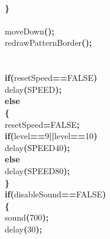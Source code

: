 \documentclass[a4paper, 10pt]{article}
\newcommand\SPC{\hspace*{0.6em}}
\newcommand\HYP{\mbox{\char 45}}
\newcommand{\CppAIdentifier}[1]{#1}
\newcommand{\CppANumber}[1]{\textcolor[rgb]{0.5,0,0.5}{#1}}
\newcommand{\CppAReservedWord}[1]{\textbf{#1}}
\newcommand{\CppASpace}[1]{\colorbox[rgb]{1,1,1}{#1}}
\newcommand{\CppASymbol}[1]{\textbf{\textcolor[rgb]{1,0,0}{#1}}}
\begin{document}
\begin{ttfamily}
\\
\CppASpace{\SPC \SPC \SPC }\CppASymbol{\}}\\
\\
\CppASpace{\SPC \SPC \SPC }\CppAIdentifier{moveDown}\CppASymbol{(}\CppASymbol{)}\CppASymbol{;}\\
\CppASpace{\SPC \SPC \SPC }\CppAIdentifier{redrawPatternBorder}\CppASymbol{(}\CppASymbol{)}\CppASymbol{;}\\
\\
\\
\CppASpace{\SPC \SPC \SPC }\CppAReservedWord{if}\CppASymbol{(}\CppAIdentifier{resetSpeed}\CppASymbol{==}\CppAIdentifier{FALSE}\CppASymbol{)}\\
\CppASpace{\SPC \SPC \SPC }\CppAIdentifier{delay}\CppASymbol{(}\CppAIdentifier{SPEED}\CppASymbol{)}\CppASymbol{;}\\
\CppASpace{\SPC \SPC \SPC }\CppAReservedWord{else}\\
\CppASpace{\SPC \SPC \SPC }\CppASymbol{\{}\\
\CppASpace{\SPC \SPC \SPC \SPC }\CppAIdentifier{resetSpeed}\CppASymbol{=}\CppAIdentifier{FALSE}\CppASymbol{;}\\
\CppASpace{\SPC \SPC \SPC \SPC }\CppAReservedWord{if}\CppASymbol{(}\CppAIdentifier{level}\CppASymbol{==}\CppANumber{9}\CppASymbol{||}\CppAIdentifier{level}\CppASymbol{==}\CppANumber{10}\CppASymbol{)}\\
\CppASpace{\SPC \SPC \SPC \SPC }\CppAIdentifier{delay}\CppASymbol{(}\CppAIdentifier{SPEED}\CppASymbol{\HYP }\CppANumber{40}\CppASymbol{)}\CppASymbol{;}\\
\CppASpace{\SPC \SPC \SPC \SPC }\CppAReservedWord{else}\\
\CppASpace{\SPC \SPC \SPC \SPC }\CppAIdentifier{delay}\CppASymbol{(}\CppAIdentifier{SPEED}\CppASymbol{\HYP }\CppANumber{80}\CppASymbol{)}\CppASymbol{;}\\
\CppASpace{\SPC \SPC \SPC }\CppASymbol{\}}\\
\CppASpace{\SPC \SPC \SPC }\CppAReservedWord{if}\CppASymbol{(}\CppAIdentifier{disableSound}\CppASymbol{==}\CppAIdentifier{FALSE}\CppASymbol{)}\\
\CppASpace{\SPC \SPC \SPC }\CppASymbol{\{}\\
\CppASpace{\SPC \SPC \SPC \SPC }\CppAIdentifier{sound}\CppASymbol{(}\CppANumber{700}\CppASymbol{)}\CppASymbol{;}\\
\CppASpace{\SPC \SPC \SPC \SPC }\CppAIdentifier{delay}\CppASymbol{(}\CppANumber{30}\CppASymbol{)}\CppASymbol{;}\\

\end{ttfamily}
\end{document}
